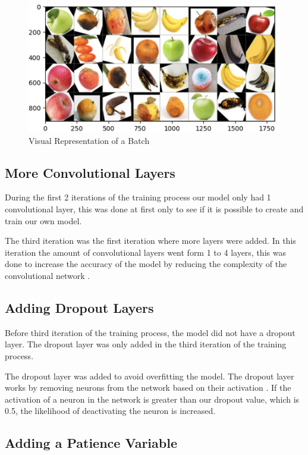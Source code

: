 \documentclass[conference]{IEEEtran}
\begin{document}
\begin{figure}[h]
    \centering
    \includegraphics[width=\linewidth]{Batch_Representation.jpg}
    \caption{Visual Representation of a Batch}
    \label{fig}
\end{figure}

\subsection{More Convolutional Layers}

During the first 2 iterations of the training process our model only had 1 convolutional layer, this was done at first only to see if it is possible to create and train our own model. 

The third iteration was the first iteration where more layers were added. In this iteration the amount of convolutional layers went form 1 to 4 layers, this was done to increase the accuracy of the model by reducing the complexity of the convolutional network \cite{b3}.

\subsection{Adding Dropout Layers}

Before third iteration of the training process, the model did not have a dropout layer. The dropout layer was only added in the third iteration of the training process.

The dropout layer was added to avoid overfitting the model. The dropout layer works by removing neurons from the network based on their activation \cite{b5}. If the activation of a neuron in the network is greater than our dropout value, which is 0.5, the likelihood of deactivating the neuron is increased.

\subsection{Adding a Patience Variable}
\end{document}
